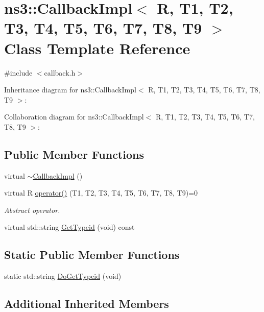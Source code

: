 \hypertarget{classns3_1_1CallbackImpl}{}\section{ns3\+:\+:Callback\+Impl$<$ R, T1, T2, T3, T4, T5, T6, T7, T8, T9 $>$ Class Template Reference}
\label{classns3_1_1CallbackImpl}


{\ttfamily \#include $<$callback.\+h$>$}



Inheritance diagram for ns3\+:\+:Callback\+Impl$<$ R, T1, T2, T3, T4, T5, T6, T7, T8, T9 $>$\+:


Collaboration diagram for ns3\+:\+:Callback\+Impl$<$ R, T1, T2, T3, T4, T5, T6, T7, T8, T9 $>$\+:
\subsection*{Public Member Functions}
\begin{DoxyCompactItemize}
\item 
virtual \hyperlink{classns3_1_1CallbackImpl_a55f169d840692c2bc1891b4ca5b52d16}{$\sim$\+Callback\+Impl} ()
\item 
virtual R \hyperlink{classns3_1_1CallbackImpl_a17d295d897fe07ffced2f5b2d413f80b}{operator()} (T1, T2, T3, T4, T5, T6, T7, T8, T9)=0
\begin{DoxyCompactList}\small\item\em Abstract operator. \end{DoxyCompactList}\item 
virtual std\+::string \hyperlink{classns3_1_1CallbackImpl_aab5fcaecd5a7372c6ee890352b9c3ffa}{Get\+Typeid} (void) const 
\end{DoxyCompactItemize}
\subsection*{Static Public Member Functions}
\begin{DoxyCompactItemize}
\item 
static std\+::string \hyperlink{classns3_1_1CallbackImpl_a5a9453661514b1f16878e2fd278ff384}{Do\+Get\+Typeid} (void)
\end{DoxyCompactItemize}
\subsection*{Additional Inherited Members}


